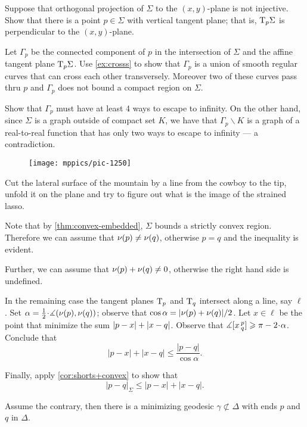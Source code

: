 Suppose that orthogonal projection of $\Sigma$ to the $(x,y)$-plane is not injective.
Show that there is a point $p\in\Sigma$ with vertical tangent plane;
that is, $\mathrm{T}_p\Sigma$ is perpendicular to the $(x,y)$-plane.

Let $\Gamma_p$ be the connected component of $p$ in the intersection of $\Sigma$ and the affine tangent plane $\mathrm{T}_p\Sigma$.
Use \ref{ex:crosss} to show that $\Gamma_p$ is a union of smooth regular curves that can cross each other transversely.
Moreover two of these curves pass thru $p$ and $\Gamma_p$ does not bound a compact region on $\Sigma$.

Show that $\Gamma_p$ must have at least 4 ways to escape to infinity.
On the other hand, since $\Sigma$ is a graph outside of compact set $K$, we have that $\Gamma_p\backslash K$ is a graph of a real-to-real function that has only two ways to escape to infinity --- a contradiction.

\setcounter{eqtn}{0}

\begin{wrapfigure}[5]{r}{24 mm}
\vskip-4mm
\centering
\texttt{[image: mppics/pic-1250]}
\vskip-0mm
\end{wrapfigure}

 Cut the lateral surface of the mountain by a line from the cowboy to the tip, unfold it on the plane and try to figure out what is the image of the strained lasso.

Note that by \ref{thm:convex-embedded}, $\Sigma$ bounds a strictly convex region.
Therefore we can assume that $\nu(p)\ne\nu(q)$, otherwise $p=q$ and the inequality is evident.

Further, we can assume that $\nu(p)+\nu(q)\ne 0$, otherwise the right hand side is undefined.


In the remaining case the tangent planes $\mathrm{T}_p$ and $\mathrm{T}_q$ intersect along a line, say $\ell$.
Set $\alpha=\tfrac12\cdot\measuredangle(\Norm(p),\Norm(q))$;
observe that $\cos\alpha= |\nu(p)+\nu(q)|/2$.
Let $x\in \ell$ be the point that minimize the sum $|p-x|\z+|x-q|$.
Observe that $\measuredangle\hinge xpq\ge \pi-2\cdot\alpha$.
Conclude that 
\[|p-x|+|x-q|\le \frac{|p-q|}{\cos\alpha}.\]

Finally, apply \ref{cor:shorts+convex} to show that
\[|p-q|_\Sigma\le |p-x|+|x-q|.\]


 Assume the contrary,
then there is a minimizing geodesic $\gamma\not\subset\Delta$ with ends $p$ and $q$ in $\Delta$.

